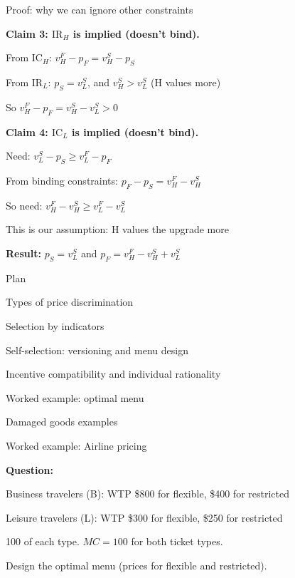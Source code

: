 \documentclass[notes,11pt, aspectratio=169]{beamer}
\newenvironment{wideitemize}{\itemize\addtolength{\itemsep}{10pt}}{\enditemize}
\newenvironment{wideenumerate}{\enumerate\addtolength{\itemsep}{10pt}}{\endenumerate}
\begin{document}
\begin{frame}{Proof: why we can ignore other constraints}
	\begin{wideitemize}
		\item \textbf{Claim 3: $\text{IR}_H$ is implied (doesn't bind).}
		\begin{wideitemize}
			\vspace{3pt}
			\item From $\text{IC}_H$: $v_H^F - p_F = v_H^S - p_S$
			\item From $\text{IR}_L$: $p_S = v_L^S$, and $v_H^S > v_L^S$ (H values more)
			\item So $v_H^F - p_F = v_H^S - v_L^S > 0$
		\end{wideitemize}
		\item \textbf{Claim 4: $\text{IC}_L$ is implied (doesn't bind).}
		\begin{wideitemize}
			\vspace{3pt}
			\item Need: $v_L^S - p_S \geq v_L^F - p_F$
			\item From binding constraints: $p_F - p_S = v_H^F - v_H^S$
			\item So need: $v_H^F - v_H^S \geq v_L^F - v_L^S$
			\item This is our assumption: H values the upgrade more
		\end{wideitemize}
		\item \textbf{Result:} $p_S = v_L^S$ and $p_F = v_H^F - v_H^S + v_L^S$
	\end{wideitemize}
\end{frame}

\begin{frame}{Plan}
  \begin{wideenumerate}
    \item Types of price discrimination
    \item Selection by indicators
    \item Self-selection: versioning and menu design
    \item Incentive compatibility and individual rationality
    \item Worked example: optimal menu
    \item Damaged goods examples
  \end{wideenumerate}
\end{frame}

\begin{frame}{Worked example: Airline pricing}
	\begin{wideitemize}
		\item \textbf{Question:}
		\item Business travelers (B): WTP \$800 for flexible, \$400 for restricted
		\item Leisure travelers (L): WTP \$300 for flexible, \$250 for restricted
		\item 100 of each type. $MC = 100$ for both ticket types.
		\item Design the optimal menu (prices for flexible and restricted).
	\end{wideitemize}
\end{frame}
\end{document}
